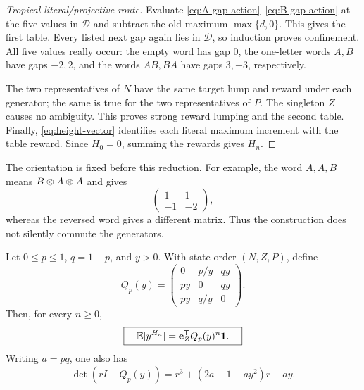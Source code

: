 \begin{proof}[Tropical literal/projective route]
Evaluate \eqref{eq:A-gap-action}--\eqref{eq:B-gap-action} at the five values
in $\mathcal D$ and subtract the old maximum $\max\{d,0\}$.  This gives the
first table.  Every listed next gap again lies in $\mathcal D$, so induction
proves confinement.  All five values really occur: the empty word has gap
$0$, the one-letter words $A,B$ have gaps $-2,2$, and the words $AB,BA$
have gaps $3,-3$, respectively.

The two representatives of $N$ have the same target lump and reward under
each generator; the same is true for the two representatives of $P$.
The singleton $Z$ causes no ambiguity.  This proves strong reward lumping
and the second table.  Finally, \eqref{eq:height-vector} identifies each
literal maximum increment with the table reward.  Since $H_0=0$, summing the
rewards gives $H_n$.
\end{proof}

The orientation is fixed before this reduction.  For example, the word
$A,A,B$ means $B\otimes A\otimes A$ and gives
\[
 \begin{pmatrix}1&1\\-1&-2\end{pmatrix},
\]
whereas the reversed word gives a different matrix.  Thus the construction
does not silently commute the generators.

\begin{theorem}
\label{thm:finite-pgf}
Let $0\leq p\leq1$, $q=1-p$, and $y>0$.  With state order $(N,Z,P)$, define
\begin{equation}
 \label{eq:Q}
 Q_p(y)=
 \begin{pmatrix}
 0&p/y&qy\\
 py&0&qy\\
 py&q/y&0
 \end{pmatrix}.
\end{equation}
Then, for every $n\geq0$,
\begin{equation}
 \label{eq:finite-pgf}
 \boxed{\quad
 \mathbb{E}[y^{H_n}]=\mathbf e_{Z}^{\mathsf T}Q_p(y)^n\mathbf{1}.
 \quad}
\end{equation}
Writing $a=pq$, one also has
\begin{equation}
 \label{eq:cubic}
 \boxed{\quad
 \det(rI-Q_p(y))
 =r^3+(2a-1-ay^2)r-ay.
 \quad}
\end{equation}
\end{theorem}

